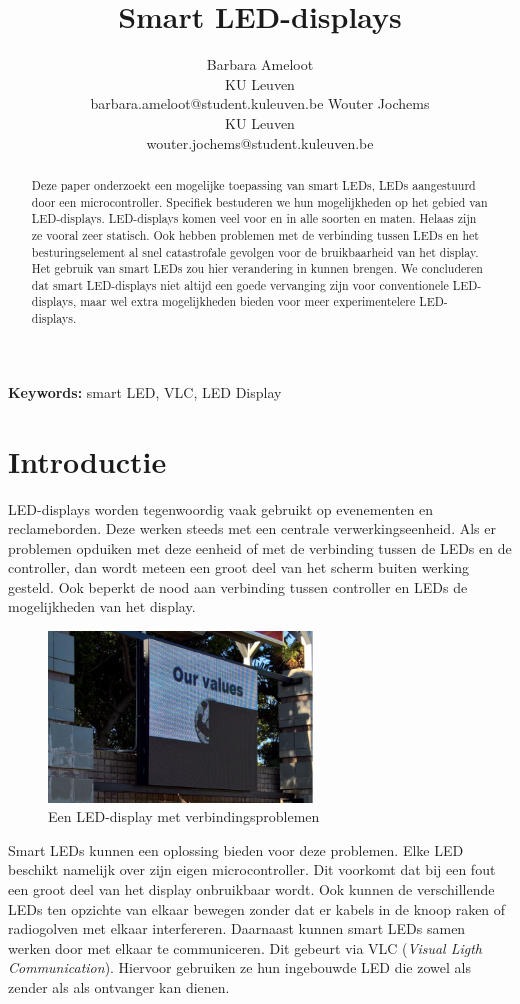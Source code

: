 \documentclass{article}
\title{Smart LED-displays}
\author{Barbara Ameloot\\
KU Leuven\\
barbara.ameloot@student.kuleuven.be
\And 
Wouter Jochems\\
KU Leuven\\
wouter.jochems@student.kuleuven.be}
\begin{document}
\maketitle

\begin{abstract}
Deze paper onderzoekt een mogelijke toepassing van smart LEDs, LEDs aangestuurd door een micro\-controller. Specifiek bestuderen we hun mogelijkheden op het gebied van LED-displays. LED-displays komen veel voor en in alle soorten en maten. Helaas zijn ze vooral zeer statisch. Ook hebben problemen met de verbinding tussen LEDs en het besturingselement al snel catastrofale gevolgen voor de bruikbaarheid van het display. Het gebruik van smart LEDs zou hier verandering in kunnen brengen. We concluderen dat smart LED-displays niet altijd een goede vervanging zijn voor conventionele LED-displays, maar wel extra mogelijkheden bieden voor meer experimentelere LED-displays.
\end{abstract}

{\bf Keywords:} smart LED, VLC, LED Display


\section{Introductie}

LED-displays worden tegenwoordig vaak gebruikt op evenementen en reclameborden. Deze werken steeds met een centrale verwerkingseenheid. Als er problemen opduiken met deze eenheid of met de verbinding tussen de LEDs en de controller, dan wordt meteen een groot deel van het scherm buiten werking gesteld\cite{brokenDisplay}. Ook beperkt de nood aan verbinding tussen controller en LEDs de mogelijkheden van het display. 
\begin{figure}[H]
\centering
\includegraphics[width=7cm]{broken.png}
\caption{Een LED-display met verbindingsproblemen}
\end{figure}
Smart LEDs kunnen een oplossing bieden voor deze problemen. Elke LED beschikt namelijk over zijn eigen microcontroller. Dit voorkomt dat bij een fout een groot deel van het display onbruikbaar wordt. Ook kunnen de verschillende LEDs ten opzichte van elkaar bewegen zonder dat er kabels in de knoop raken of radiogolven met elkaar interfereren. Daarnaast kunnen smart LEDs samen werken door met elkaar te communiceren. Dit gebeurt via VLC (\textit{Visual Ligth Communication}). Hiervoor gebruiken ze hun ingebouwde LED die zowel als zender als als ontvanger kan dienen. 
\end{document}
